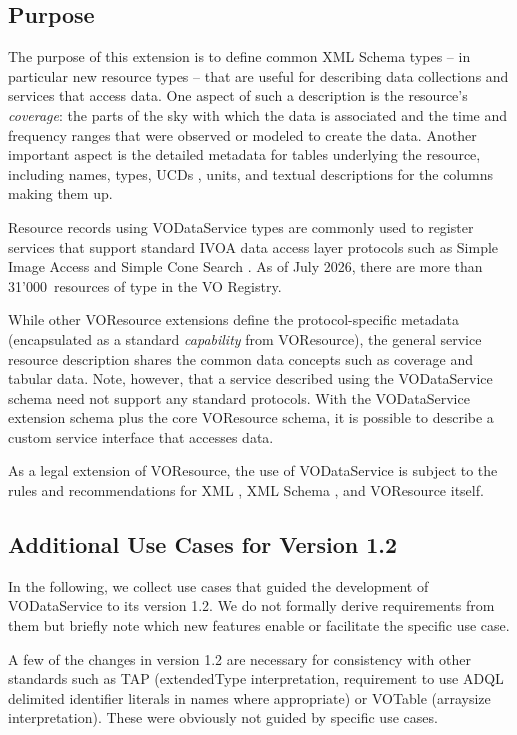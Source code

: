 \documentclass[11pt,a4paper]{ivoa}
\begin{document}
\subsection{Purpose}


The purpose of this extension is to define common XML Schema
types -- in particular new resource types -- that are useful for describing
data collections and services that access data.  One aspect of such a
description is the resource's \emph{coverage}:  the parts of the
sky with which the data is associated and the time and frequency ranges that
were observed or modeled to create the data.  Another important aspect
is the detailed metadata for tables underlying the resource, including
names, types, UCDs
\citep{2023ivoa.spec.0125C}, units,
and textual descriptions for the columns making them up.

Resource records using VODataService types are commonly used to register
services that support standard IVOA data access layer protocols such
as Simple Image Access \citep{2015ivoa.spec.1223D} and Simple Cone Search
\citep{2008ivoa.specQ0222P}.  As of July 2026, there are more than
31'000~resources of type  in the VO Registry.

While other VOResource extensions
define the protocol-specific metadata (encapsulated as a standard
\emph{capability} from VOResource), the general service
resource description shares the common data concepts such as
coverage and tabular data.  Note, however, that a service described
using the VODataService schema need not support any standard
protocols.  With the VODataService extension schema plus the core
VOResource schema, it is possible to describe a custom service
interface that accesses data.



As a legal extension of VOResource, the use
of VODataService is subject to the rules and recommendations for XML
\citep{std:XML}, XML Schema \citep{std:XSD},
and VOResource itself.

\subsection{Additional Use Cases for Version 1.2}

In the following, we collect use cases that guided the development of
VODataService to its version 1.2.  We do not formally derive
requirements from them but briefly note which new features enable or
facilitate the specific use case.

A few of the changes in version 1.2 are necessary for consistency with other standards
such as TAP (extendedType interpretation, requirement to use ADQL
delimited identifier literals in names where appropriate) or VOTable
(arraysize interpretation).  These were obviously not guided by specific
use cases.
\end{document}
